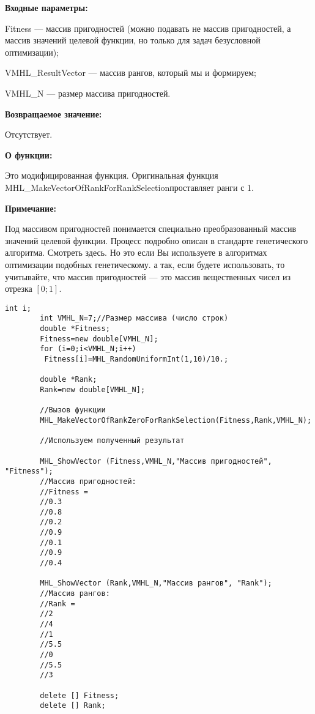 \documentclass[a4paper,12pt]{article}
\begin{document}
\textbf{Входные параметры:}

 Fitness --- массив пригодностей (можно подавать не массив пригодностей, а массив значений целевой функции, но только для задач безусловной оптимизации);
 
 VMHL\_ResultVector --- массив рангов, который мы и формируем;
 
 VMHL\_N --- размер массива пригодностей.
 
\textbf{Возвращаемое значение:} 
 
Отсутствует.
 
\textbf{О функции:}

Это модифицированная функция. Оригинальная функция MHL\_MakeVectorOfRankForRankSelectionпроставляет ранги с 1.

\textbf{Примечание:}

 Под массивом пригодностей понимается специально преобразованный массив значений целевой функции. Процесс подробно описан в стандарте генетического алгоритма. Смотреть здесь. Но это если Вы используете в алгоритмах оптимизации подобных генетическому. а так, если будете использовать, то учитывайте, что массив пригодностей --- это массив вещественных чисел из отрезка $[0;1]$.



\begin{lstlisting}[label=code_use_MHL_MakeVectorOfRankZeroForRankSelection,caption=Пример использования]
        int i;
        int VMHL_N=7;//Размер массива (число строк)
        double *Fitness;
        Fitness=new double[VMHL_N];
        for (i=0;i<VMHL_N;i++)
         Fitness[i]=MHL_RandomUniformInt(1,10)/10.;

        double *Rank;
        Rank=new double[VMHL_N];

        //Вызов функции
        MHL_MakeVectorOfRankZeroForRankSelection(Fitness,Rank,VMHL_N);

        //Используем полученный результат

        MHL_ShowVector (Fitness,VMHL_N,"Массив пригодностей", "Fitness");
        //Массив пригодностей:
        //Fitness =
        //0.3
        //0.8
        //0.2
        //0.9
        //0.1
        //0.9
        //0.4

        MHL_ShowVector (Rank,VMHL_N,"Массив рангов", "Rank");
        //Массив рангов:
        //Rank =
        //2
        //4
        //1
        //5.5
        //0
        //5.5
        //3

        delete [] Fitness;
        delete [] Rank;
\end{lstlisting}
\end{document}
